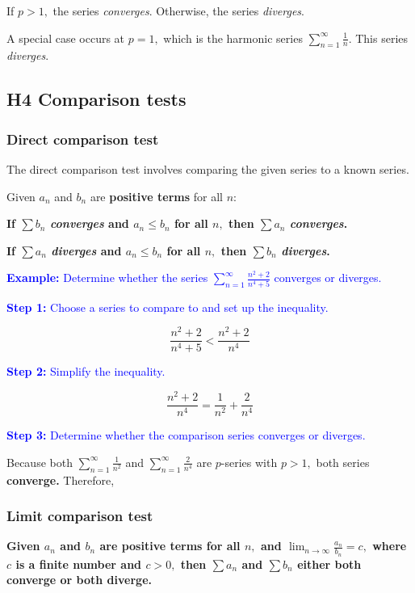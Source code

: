 \documentclass[letterpaper, 12pt]{article}
\newcommand{\example}[1]{\textcolor{blue}{\textbf{Example:} #1}}
\newcommand{\step}[2]{\textcolor{blue}{\textbf{Step #1:} #2}}
\begin{document}
If $p > 1,$ the series \textit{converges}. Otherwise, the series \textit{diverges}.

A special case occurs at $p = 1,$ which is the harmonic series $\displaystyle \sum_{n=1}^\infty \frac{1}{n}$. This series \textit{diverges}.

\subsection*{H4 Comparison tests}

\subsubsection*{Direct comparison test}

The direct comparison test involves comparing the given series to a known series.

Given $a_n$ and $b_n$ are \textbf{positive terms} for all $n$:

\textbf{If $\displaystyle \sum b_n$ \textit{converges} and $a_n \leq b_n$ for all $n,$ then $\displaystyle \sum a_n$ \textit{converges}.}

\textbf{If $\displaystyle \sum a_n$ \textit{diverges} and $a_n \leq b_n$ for all $n,$ then $\displaystyle \sum b_n$ \textit{diverges}.}

\example{Determine whether the series $\displaystyle \sum_{n=1}^\infty \frac{n^2+2}{n^4+5}$ converges or diverges.}

\step{1}{Choose a series to compare to and set up the inequality.}

$$\frac{n^2+2}{n^4+5} < \frac{n^2+2}{n^4}$$

\step{2}{Simplify the inequality.}

$$\frac{n^2+2}{n^4} = \frac{1}{n^2} + \frac{2}{n^4}$$

\step{3}{Determine whether the comparison series converges or diverges.}

Because both $\displaystyle \sum_{n=1}^\infty \frac{1}{n^2}$ and $\displaystyle \sum_{n=1}^\infty \frac{2}{n^4}$ are $p$-series with $p > 1,$ both series \textbf{converge.} Therefore, 

\subsubsection*{Limit comparison test}

\textbf{Given $a_n$ and $b_n$ are positive terms for all $n,$ and $\displaystyle \lim_{n \to \infty} \frac{a_n}{b_n} = c,$ where $c$ is a finite number and $c > 0,$ \textbf{then $\displaystyle \sum a_n$ and $\displaystyle \sum b_n$ either both converge or both diverge.}}
\end{document}
